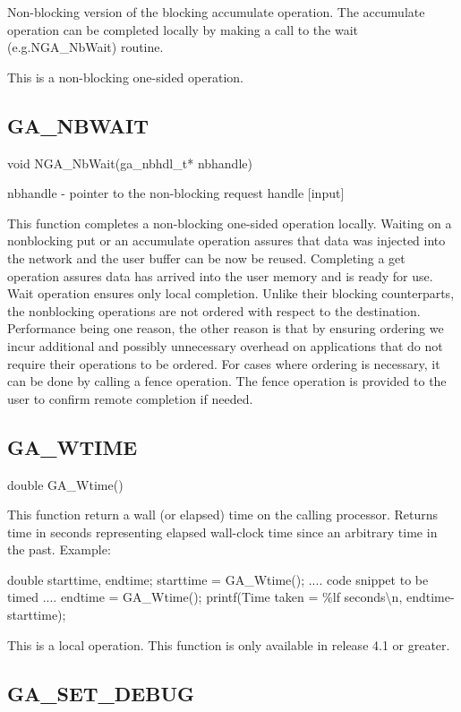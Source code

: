 Non-blocking version of the blocking accumulate operation. The accumulate
operation can be completed locally by making a call to the wait (e.g.NGA\_NbWait)
routine.

This is a non-blocking one-sided operation. 


\subsection*{GA\_NBWAIT}

void NGA\_NbWait(ga\_nbhdl\_t{*} nbhandle)

nbhandle - pointer to the non-blocking request handle {[}input{]}

This function completes a non-blocking one-sided operation locally.
Waiting on a nonblocking put or an accumulate operation assures that
data was injected into the network and the user buffer can be now
be reused. Completing a get operation assures data has arrived into
the user memory and is ready for use. Wait operation ensures only
local completion. Unlike their blocking counterparts, the nonblocking
operations are not ordered with respect to the destination. Performance
being one reason, the other reason is that by ensuring ordering we
incur additional and possibly unnecessary overhead on applications
that do not require their operations to be ordered. For cases where
ordering is necessary, it can be done by calling a fence operation.
The fence operation is provided to the user to confirm remote completion
if needed. 


\subsection*{GA\_WTIME}

double GA\_Wtime()

This function return a wall (or elapsed) time on the calling processor.
Returns time in seconds representing elapsed wall-clock time since
an arbitrary time in the past. Example:

double starttime, endtime; starttime = GA\_Wtime(); .... code snippet
to be timed .... endtime = GA\_Wtime(); printf(\textquotedbl{}Time
taken = \%lf seconds\textbackslash{}n\textquotedbl{}, endtime-starttime);

This is a local operation. This function is only available in release
4.1 or greater. 


\subsection*{GA\_SET\_DEBUG}

